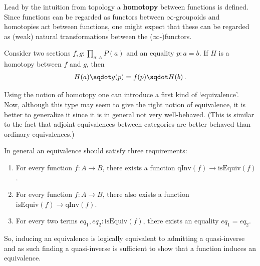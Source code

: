     Lead by the intuition from topology a \textbf{homotopy} between functions is defined.
    Since functions can be regarded as functors between $\infty$-groupoids and homotopies act between functions, one might expect that these can be regarded as (weak) natural transformations between the ($\infty$-)functors.
    \begin{property}
        Consider two sections $f,g:\prod_{a:A}P(a)$ and an equality $p:a=b$. If $H$ is a homotopy between $f$ and $g$, then
        \begin{gather}
            H(a)\sqdot g(p) = f(p)\sqdot H(b)\,.
        \end{gather}
    \end{property}

    Using the notion of homotopy one can introduce a first kind of `equivalence'.
    Now, although this type may seem to give the right notion of equivalence, it is better to generalize it since it is in general not very well-behaved. (This is similar to the fact that adjoint equivalences between categories are better behaved than ordinary equivalences.)

    In general an equivalence should satisfy three requirements:
    \begin{enumerate}
        \item For every function $f:A\rightarrow B$, there exists a function $\mathrm{qInv}(f)\rightarrow\mathrm{isEquiv}(f)$.
        \item For every function $f:A\rightarrow B$, there also exists a function $\mathrm{isEquiv}(f)\rightarrow\mathrm{qInv}(f)$.
        \item For every two terms $eq_1,eq_2:\mathrm{isEquiv}(f)$, there exists an equality $eq_1=eq_2$.
    \end{enumerate}
    So, inducing an equivalence is logically equivalent to admitting a quasi-inverse and as such finding a quasi-inverse is sufficient to show that a function induces an equivalence.

